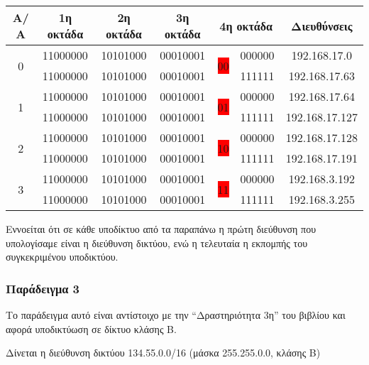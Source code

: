 \begin{center}
\fontsize{10}{12}
\ttfamily
\begin{tabular}{|c|c|c|c|c|c|c|}
\hline
                Α/Α  & 1η οκτάδα  & 2η οκτάδα  & 3η οκτάδα  & \multicolumn{2}{c|}{ 4η οκτάδα }  & Διευθύνσεις \\ \hline

\multirow{2}{*}{0} & 11000000 & 10101000 & 00010001 & \multirow{2}{*}{\colorbox{red}{00}}  & 000000 & 192.168.17.0 \\ \cline{2-4} \cline{6-7} 
                  & 11000000 & 10101000 & 00010001 &                    & 111111 & 192.168.17.63  \\ \hline

\multirow{2}{*}{1} & 11000000  & 10101000 & 00010001  & \multirow{2}{*}{\colorbox{red}{01}}  & 000000  & 192.168.17.64 \\ \cline{2-4} \cline{6-7} 
                  & 11000000 & 10101000 & 00010001 &                    & 111111 & 192.168.17.127 \\ \hline
\multirow{2}{*}{2} & 11000000  & 10101000  & 00010001 & \multirow{2}{*}{\colorbox{red}{10}}  & 000000 & 192.168.17.128 \\ \cline{2-4} \cline{6-7} 
                  & 11000000 & 10101000  & 00010001 &                    & 111111 & 192.168.17.191 \\ \hline
\multirow{2}{*}{3} & 11000000  & 10101000 & 00010001  & \multirow{2}{*}{\colorbox{red}{11}}  & 000000 & 192.168.3.192 \\ \cline{2-4} 
\cline{6-7} 
                  & 11000000 & 10101000  & 00010001 &                    & 111111 & 192.168.3.255 \\ \hline
\end{tabular}
\normalfont
\end{center}

Εννοείται ότι σε κάθε υποδίκτυο από τα παραπάνω η πρώτη διεύθυνση που υπολογίσαμε είναι η διεύθυνση δικτύου, ενώ η τελευταία η εκπομπής του συγκεκριμένου υποδικτύου.

\subsubsection*{Παράδειγμα 3}

Το παράδειγμα αυτό είναι αντίστοιχο με την ``Δραστηριότητα 3η'' του βιβλίου και αφορά υποδικτύωση σε δίκτυο κλάσης B.

Δίνεται η διεύθυνση δικτύου 134.55.0.0/16 (μάσκα 255.255.0.0, κλάσης B)

